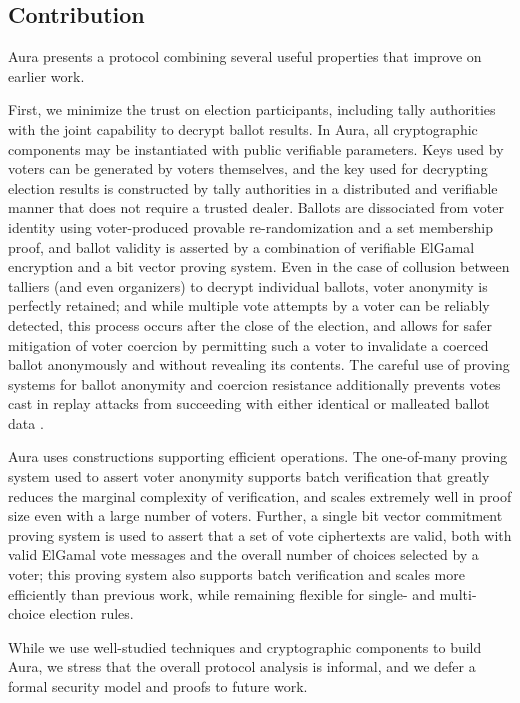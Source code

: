 \documentclass{llncs}
\begin{document}
\subsection{Contribution}

Aura presents a protocol combining several useful properties that improve on earlier work.

First, we minimize the trust on election participants, including tally authorities with the joint capability to decrypt ballot results.
In Aura, all cryptographic components may be instantiated with public verifiable parameters.
Keys used by voters can be generated by voters themselves, and the key used for decrypting election results is constructed by tally authorities in a distributed and verifiable manner that does not require a trusted dealer.
Ballots are dissociated from voter identity using voter-produced provable re-randomization and a set membership proof, and ballot validity is asserted by a combination of verifiable ElGamal encryption and a bit vector proving system.
Even in the case of collusion between talliers (and even organizers) to decrypt individual ballots, voter anonymity is perfectly retained; and while multiple vote attempts by a voter can be reliably detected, this process occurs after the close of the election, and allows for safer mitigation of voter coercion by permitting such a voter to invalidate a coerced ballot anonymously and without revealing its contents.
The careful use of proving systems for ballot anonymity and coercion resistance additionally prevents votes cast in replay attacks from succeeding with either identical or malleated ballot data \cite{replay}.

Aura uses constructions supporting efficient operations.
The one-of-many proving system used to assert voter anonymity supports batch verification that greatly reduces the marginal complexity of verification, and scales extremely well in proof size even with a large number of voters.
Further, a single bit vector commitment proving system is used to assert that a set of vote ciphertexts are valid, both with valid ElGamal vote messages and the overall number of choices selected by a voter; this proving system also supports batch verification and scales more efficiently than previous work, while remaining flexible for single- and multi-choice election rules.

While we use well-studied techniques and cryptographic components to build Aura, we stress that the overall protocol analysis is informal, and we defer a formal security model and proofs to future work.
\end{document}

